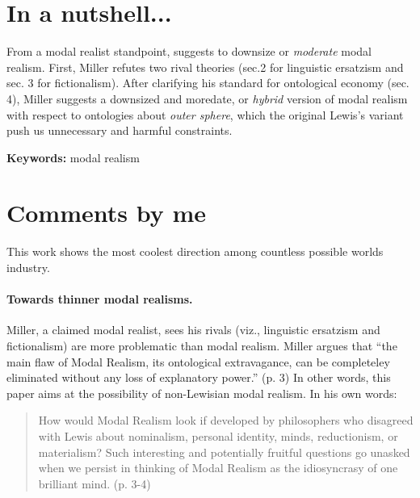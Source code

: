 \documentclass[
10pt, %
a4paper, %
twocolumn, %
landscape %
]{article}
\begin{document}
\pagestyle{myheadings} %
\markright{\doctitle} %


\thispagestyle{plain} %

\printtitle %


\section*{In a nutshell... }
From a modal realist standpoint, \cite{Miller2001ModerateModalRealism} suggests to downsize or \emph{moderate} modal realism.
First, Miller refutes two rival theories (sec.2 for linguistic ersatzism and sec. 3 for fictionalism).
After clarifying his standard for ontological economy (sec. 4), Miller suggests a downsized and moredate, or \emph{hybrid} version of modal realism with respect to ontologies about \emph{outer sphere}, which the original Lewis's variant push us unnecessary and harmful constraints.  

\noindent \textbf{Keywords:} modal realism

\section*{Comments by me}
This work shows the most coolest direction among countless possible worlds industry.


\paragraph{Towards thinner modal realisms.}
Miller, a claimed modal realist, sees his rivals (viz., linguistic ersatzism and fictionalism) are more problematic than modal realism.
Miller argues that ``the main flaw of Modal Realism, its ontological extravagance, can be completeley eliminated without any loss of explanatory power.'' (p. 3)
In other words, this paper aims at the possibility of non-Lewisian modal realism. In his own words:

\begin{quote}
  How would Modal Realism look if developed by philosophers who disagreed with Lewis about nominalism, personal identity, minds, reductionism, or materialism? Such interesting and potentially fruitful questions go unasked when we persist in thinking of Modal Realism as the idiosyncrasy of one brilliant mind. (p. 3-4)
\end{quote}
\end{document}
